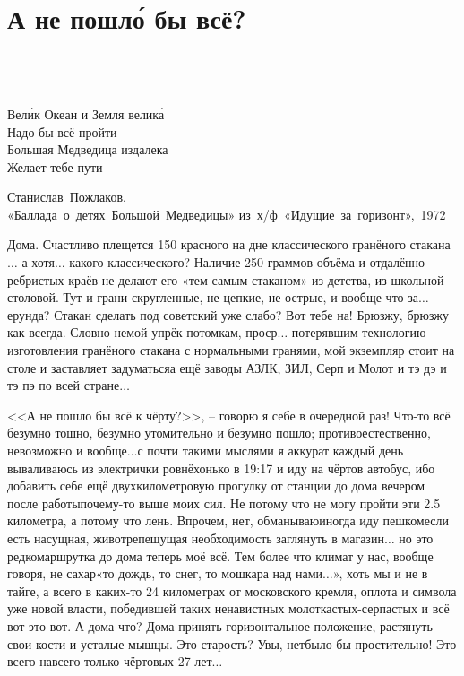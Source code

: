 \chapter{А не пошл\'{о} бы всё?} 

\epigraph{%
	~\\
	~\\	
	~\\	
	Вел\'{и}к Океан и Земля велик\'{а} \\
	Надо бы всё пройти \\
	Большая Медведица издалека \\
	Желает тебе пути}
	{
	\begin{flushright}
		\small{Станислав~Пожлаков,\\«Баллада~о~детях~Большой~Медведицы» из~х/ф~«Идущие~за~горизонт»,~1972}
	\end{flushright}
	}

Дома. Счастливо плещется 150 красного на дне классического гранёного стакана$\ldots$ а хотя$\ldots$ какого классического? Наличие 250 граммов объёма и отдалённо ребристых краёв не делают его «тем самым стаканом» из детства, из школьной столовой. Тут и грани скругленные, не цепкие, не острые, и вообще что за$\ldots$ ерунда? Стакан сделать под советский уже слабо? Вот тебе на! Брюзжу, брюзжу как всегда. Словно немой упрёк потомкам, проср$\ldots$ потерявшим технологию изготовления гранёного стакана с нормальными гранями, мой экземпляр стоит на столе и заставляет задуматься\mdash а ещё заводы АЗЛК, ЗИЛ, Серп и Молот и тэ дэ и тэ пэ по всей стране$\ldots$

<<А не пошло бы всё к чёрту?>>, – говорю я себе в очередной раз! Что-то всё безумно тошно, безумно утомительно и безумно пошло; противоестественно, невозможно и вообще$\ldots$\mdash с почти такими мыслями я аккурат каждый день вываливаюсь из электрички ровнёхонько в 19:17 и иду на чёртов автобус, ибо добавить себе ещё двухкилометровую прогулку от станции до дома вечером после работы\mdash почему-то выше моих сил. Не потому что не могу пройти эти 2.5 километра, а потому что лень. Впрочем, нет, обманываю\mdash иногда иду пешком\mdash если есть насущная, животрепещущая необходимость заглянуть в магазин$\ldots$ но это редко\mdash маршрутка до дома теперь моё всё. Тем более что климат у нас, вообще говоря, не сахар\mdash «то дождь, то снег, то мошкара над нами$\ldots$», хоть мы и не в тайге, а всего в каких-то 24 километрах от московского кремля, оплота и символа уже новой власти, победившей таких ненавистных молоткастых-серпастых и всё вот это вот. А дома что? Дома принять горизонтальное положение, растянуть свои кости и усталые мышцы. Это старость? Увы, нет\mdash было бы простительно! Это всего-навсего только чёртовых 27 лет$\ldots$

